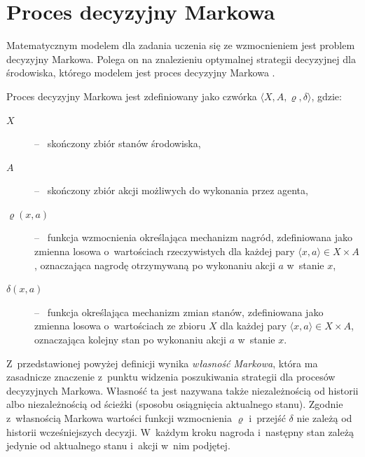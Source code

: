 \documentclass[a4paper, 12pt, oneside]{report}
\begin{document}
\section{Proces decyzyjny Markowa}
Matematycznym modelem dla zadania uczenia się ze wzmocnieniem jest problem decyzyjny Markowa. Polega on na znalezieniu optymalnej strategii decyzyjnej dla środowiska, którego modelem jest proces decyzyjny Markowa \cite{Cichosz00}.

Proces decyzyjny Markowa jest zdefiniowany jako czwórka $\langle X, A, \varrho, \delta \rangle$, gdzie:

\begin{description}
\item[$X$] -- \ skończony zbiór stanów środowiska,
\item[$A$] -- \ skończony zbiór akcji możliwych do wykonania przez agenta,
\item[$\varrho(x, a)$] -- \ funkcja wzmocnienia określająca mechanizm nagród, zdefiniowana jako zmienna losowa o~wartościach rzeczywistych dla każdej pary $\langle x,a \rangle \in X \times A$, oznaczająca nagrodę otrzymywaną po wykonaniu akcji $a$ w~stanie $x$,
\item[$\delta(x, a)$] -- \ funkcja określająca mechanizm zmian stanów, zdefiniowana jako zmienna losowa o~wartościach ze zbioru $X$ dla każdej pary $\langle x,a \rangle \in X \times A$, oznaczająca kolejny stan po wykonaniu akcji $a$ w~stanie $x$.
\end{description}

 Z~przedstawionej powyżej definicji wynika \emph{własność Markowa}, która ma zasadnicze znaczenie z~punktu widzenia poszukiwania strategii dla procesów decyzyjnych Markowa. Własność ta jest nazywana także niezależnością od historii albo niezależnością od ścieżki (sposobu osiągnięcia aktualnego stanu). Zgodnie z~własnością Markowa wartości funkcji wzmocnienia $\varrho$ i~przejść $\delta$ nie zależą od historii wcześniejszych decyzji. W~każdym kroku nagroda i~następny stan zależą jedynie od aktualnego stanu i~akcji w~nim podjętej.
\end{document}
